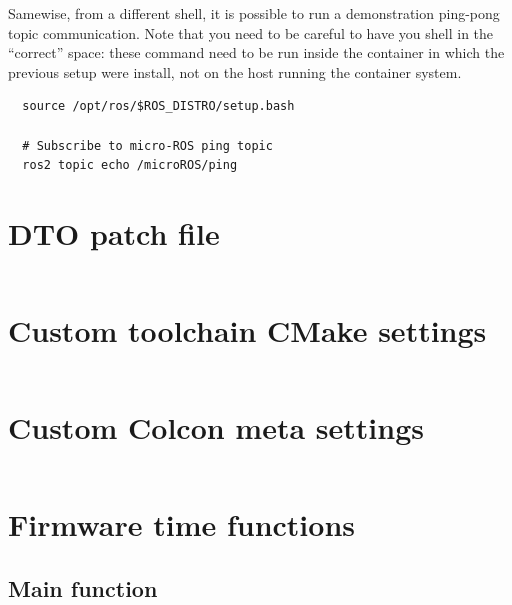 \documentclass[10pt]{article}
\begin{document}
Samewise, from a different shell, it is possible to run a demonstration ping-pong topic communication.
Note that you need to be careful to have you shell in the ``correct'' space: these command need to be run inside
the container in which the previous setup were install, not on the host running the container system.
\begin{tcolorbox}
\begin{verbatim}
  source /opt/ros/$ROS_DISTRO/setup.bash
  
  # Subscribe to micro-ROS ping topic
  ros2 topic echo /microROS/ping
\end{verbatim}
\end{tcolorbox}

\pagebreak
\appendix
\section{DTO patch file}
\label{sec:DTO patch file}
\inputminted[linenos]{diff}{./src/system.patch}

\pagebreak
\section{Custom toolchain CMake settings}
\label{sec:toolchainsettings}
\inputminted[linenos]{cmake}{./src/custom_r5f_toolchain.cmake}

\pagebreak
\section{Custom Colcon meta settings}
\label{sec:colconsettings}
\inputminted[linenos]{yaml}{./src/custom_r5f_colcon.meta}

\pagebreak
\section{Firmware time functions}
\label{sec:timefunctions}

\subsection{Main function}
\inputminted[linenos]{c}{./src/clock.c}
\end{document}
